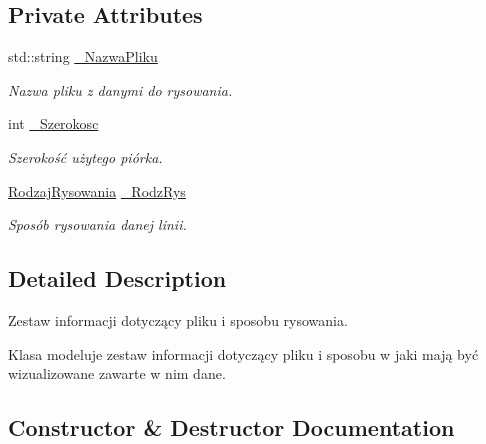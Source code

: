\subsection*{Private Attributes}
\begin{DoxyCompactItemize}
\item 
std\+::string \hyperlink{classPzG_1_1InfoPlikuDoRysowania_a07ab06c56b9c3179e566a4123ab2a037}{\+\_\+\+Nazwa\+Pliku}
\begin{DoxyCompactList}\small\item\em Nazwa pliku z danymi do rysowania. \end{DoxyCompactList}\item 
int \hyperlink{classPzG_1_1InfoPlikuDoRysowania_a56a03dde7a7a414dbf3c230812a8d741}{\+\_\+\+Szerokosc}
\begin{DoxyCompactList}\small\item\em Szerokość użytego piórka. \end{DoxyCompactList}\item 
\hyperlink{namespacePzG_a705c92106f39b7d0c34a6739d10ff0b6}{Rodzaj\+Rysowania} \hyperlink{classPzG_1_1InfoPlikuDoRysowania_ac2512f2073c66164beb2e88db31344a4}{\+\_\+\+Rodz\+Rys}
\begin{DoxyCompactList}\small\item\em Sposób rysowania danej linii. \end{DoxyCompactList}\end{DoxyCompactItemize}


\subsection{Detailed Description}
Zestaw informacji dotyczący pliku i sposobu rysowania. 

Klasa modeluje zestaw informacji dotyczący pliku i sposobu w jaki mają być wizualizowane zawarte w nim dane. 

\subsection{Constructor \& Destructor Documentation}
\mbox{\label{classPzG_1_1InfoPlikuDoRysowania_a48bc8ad94ef5fd5120b668a566c9172e}} 
